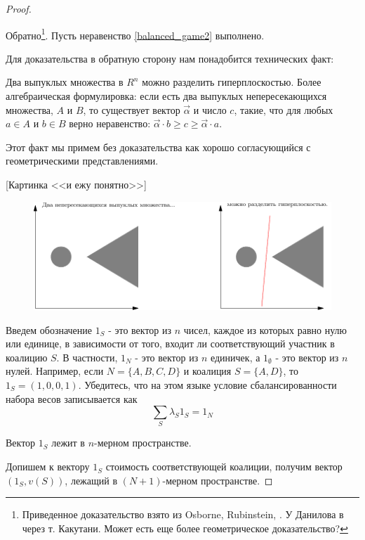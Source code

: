 \begin{proof} \label{bond.proof}

Обратно\footnote{Приведенное доказательство взято из Osborne, Rubinstein, \cite{osborne:cgt}. У Данилова в \cite{danilov:lte} через т. Какутани. Может есть еще более геометрическое доказательство?}. Пусть неравенство \ref{balanced_game2} выполнено.

Для доказательства в обратную сторону нам понадобится технических факт:
\begin{myth}
Два выпуклых множества в $R^{n}$ можно разделить гиперплоскостью. Более алгебраическая формулировка: если есть два выпуклых непересекающихся множества, $A$ и $B$, то существует вектор $\vec{\alpha}$ и число $c$, такие, что для любых $a\in A$ и $b\in B$ верно неравенство: $\vec{\alpha}\cdot b \geq c \geq \vec{\alpha}\cdot a$.
\end{myth}
Этот факт мы примем без доказательства как хорошо согласующийся с геометрическими представлениями.

[Картинка <<и ежу понятно>>]
\begin{figure}[htbp]
	\includegraphics{coop_separating.pdf}
\end{figure}


Введем обозначение $1_{S}$ - это вектор из $n$ чисел, каждое из которых равно нулю или единице, в зависимости от того, входит ли соответствующий участник в коалицию $S$. В частности, $1_{N}$ - это вектор из $n$ единичек, а $1_{\emptyset}$ - это вектор из $n$ нулей. Например, если $N=\{A,B,C,D\}$ и коалиция $S=\{A,D\}$, то $1_{S}=(1,0,0,1)$. Убедитесь, что на этом языке условие сбалансированности набора весов записывается как
\begin{equation}
\sum_{S} \lambda_{S}1_{S}=1_{N}
\end{equation}

Вектор $1_{S}$ лежит в $n$-мерном пространстве.

Допишем к вектору $1_{S}$ стоимость соответствующей коалиции, получим вектор $(1_{S},v(S))$, лежащий в $(N+1)$-мерном пространстве.


\end{proof}
